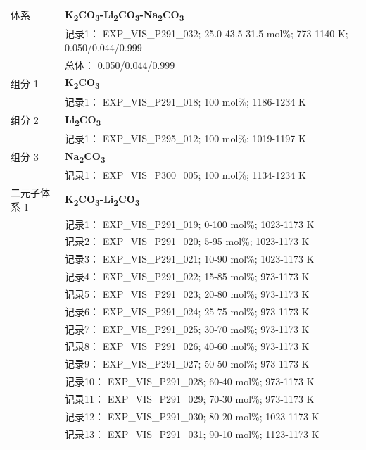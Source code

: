 \documentclass[12pt]{article}
\begin{document}
{\begin{longtable}[]{@{}
  >{\raggedright\arraybackslash}p{}
  >{\raggedright\arraybackslash}p{}@{}}
\midrule
体系 & \textbf{K\textsubscript{2}CO\textsubscript{3}-Li\textsubscript{2}CO\textsubscript{3}-Na\textsubscript{2}CO\textsubscript{3}} \\
 & 记录1： EXP\_VIS\_P291\_032; 25.0-43.5-31.5 mol\%; 773-1140 K; 0.050/0.044/0.999 \\
 & 总体： 0.050/0.044/0.999  \\

组分 1  & \textbf{K\textsubscript{2}CO\textsubscript{3}} \\
 & 记录1： EXP\_VIS\_P291\_018; 100 mol\%; 1186-1234 K  \\

组分 2  & \textbf{Li\textsubscript{2}CO\textsubscript{3}} \\
 & 记录1： EXP\_VIS\_P295\_012; 100 mol\%; 1019-1197 K  \\

组分 3  & \textbf{Na\textsubscript{2}CO\textsubscript{3}} \\
 & 记录1： EXP\_VIS\_P300\_005; 100 mol\%; 1134-1234 K  \\

二元子体系 1  & \textbf{K\textsubscript{2}CO\textsubscript{3}-Li\textsubscript{2}CO\textsubscript{3}} \\
 & 记录1： EXP\_VIS\_P291\_019; 0-100 mol\%; 1023-1173 K \\
 & 记录2： EXP\_VIS\_P291\_020; 5-95 mol\%; 1023-1173 K \\
 & 记录3： EXP\_VIS\_P291\_021; 10-90 mol\%; 1023-1173 K \\
 & 记录4： EXP\_VIS\_P291\_022; 15-85 mol\%; 973-1173 K \\
 & 记录5： EXP\_VIS\_P291\_023; 20-80 mol\%; 973-1173 K \\
 & 记录6： EXP\_VIS\_P291\_024; 25-75 mol\%; 973-1173 K \\
 & 记录7： EXP\_VIS\_P291\_025; 30-70 mol\%; 973-1173 K \\
 & 记录8： EXP\_VIS\_P291\_026; 40-60 mol\%; 973-1173 K \\
 & 记录9： EXP\_VIS\_P291\_027; 50-50 mol\%; 973-1173 K \\
 & 记录10： EXP\_VIS\_P291\_028; 60-40 mol\%; 973-1173 K \\
 & 记录11： EXP\_VIS\_P291\_029; 70-30 mol\%; 973-1173 K \\
 & 记录12： EXP\_VIS\_P291\_030; 80-20 mol\%; 1023-1173 K \\
 & 记录13： EXP\_VIS\_P291\_031; 90-10 mol\%; 1123-1173 K  \\


\end{longtable}}
\end{document}

